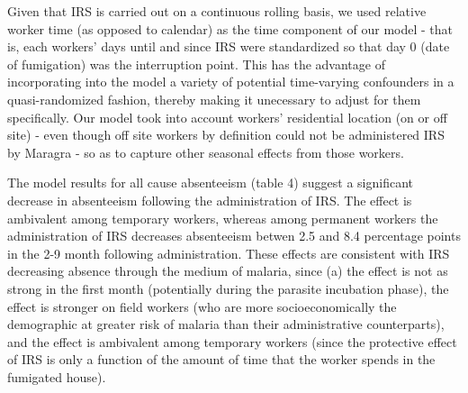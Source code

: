 \documentclass[]{article}
\begin{document}
Given that IRS is carried out on a continuous rolling basis, we used
relative worker time (as opposed to calendar) as the time component of
our model - that is, each workers' days until and since IRS were
standardized so that day 0 (date of fumigation) was the interruption
point. This has the advantage of incorporating into the model a variety
of potential time-varying confounders in a quasi-randomized fashion,
thereby making it unecessary to adjust for them specifically. Our model
took into account workers' residential location (on or off site) - even
though off site workers by definition could not be administered IRS by
Maragra - so as to capture other seasonal effects from those workers.

The model results for all cause absenteeism (table 4) suggest a
significant decrease in absenteeism following the administration of IRS.
The effect is ambivalent among temporary workers, whereas among
permanent workers the administration of IRS decreases absenteeism betwen
2.5 and 8.4 percentage points in the 2-9 month following administration.
These effects are consistent with IRS decreasing absence through the
medium of malaria, since (a) the effect is not as strong in the first
month (potentially during the parasite incubation phase), the effect is
stronger on field workers (who are more socioeconomically the
demographic at greater risk of malaria than their administrative
counterparts), and the effect is ambivalent among temporary workers
(since the protective effect of IRS is only a function of the amount of
time that the worker spends in the fumigated house).
\end{document}
